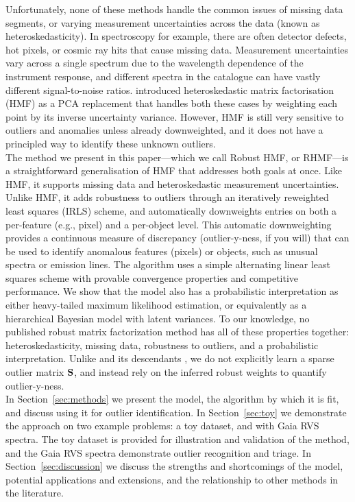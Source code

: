 \documentclass[onecolumn,floatfix]{aastex631}
\begin{document}
Unfortunately, none of these methods handle the common issues of missing data segments, or varying measurement uncertainties across the data (known as heteroskedasticity). In spectroscopy for example, there are often detector defects, hot pixels, or cosmic ray hits that cause missing data.
Measurement uncertainties vary across a single spectrum due to the wavelength dependence of the instrument response, and different spectra in the catalogue can have vastly different signal-to-noise ratios.
\citet{tsalmantza2012} introduced heteroskedastic matrix factorisation (HMF) as a PCA replacement that handles both these cases by weighting each point by its inverse uncertainty variance.
However, HMF is still very sensitive to outliers and anomalies unless already downweighted, and it does not have a principled way to identify these unknown outliers. \\

The method we present in this paper---which we call Robust HMF, or RHMF---is a straightforward generalisation of HMF that addresses both goals at once.
Like HMF, it supports missing data and heteroskedastic measurement uncertainties. Unlike HMF, it adds robustness to outliers through an iteratively reweighted least squares (IRLS) scheme, and automatically downweights entries on both a per-feature (e.g., pixel) and a per-object level.
This automatic downweighting provides a continuous measure of discrepancy (outlier-y-ness, if you will) that can be used to identify anomalous features (pixels) or objects, such as unusual spectra or emission lines.
The algorithm uses a simple alternating linear least squares scheme with provable convergence properties and competitive performance.
We show that the model also has a probabilistic interpretation as either heavy-tailed maximum likelihood estimation, or equivalently as a hierarchical Bayesian model with latent variances.
To our knowledge, no published robust matrix factorization method has all of these properties together: heteroskedasticity, missing data, robustness to outliers, and a probabilistic interpretation. Unlike \citet{candes2011} and its descendants \citep[e.g.,][]{zhou2010,yin2019}, we do not explicitly learn a sparse outlier matrix ${\bf S}$, and instead rely on the inferred robust weights to quantify outlier-y-ness. \\

In Section~\ref{sec:methods} we present the model, the algorithm by which it is fit, and discuss using it for outlier identification.
In Section~\ref{sec:toy} we demonstrate the approach on two example problems: a toy dataset, and with Gaia RVS spectra.
The toy dataset is provided for illustration and validation of the method, and the Gaia RVS spectra demonstrate outlier recognition and triage.
In Section~\ref{sec:discussion} we discuss the strengths and shortcomings of the model, potential applications and extensions, and the relationship to other methods in the literature.
\end{document}
